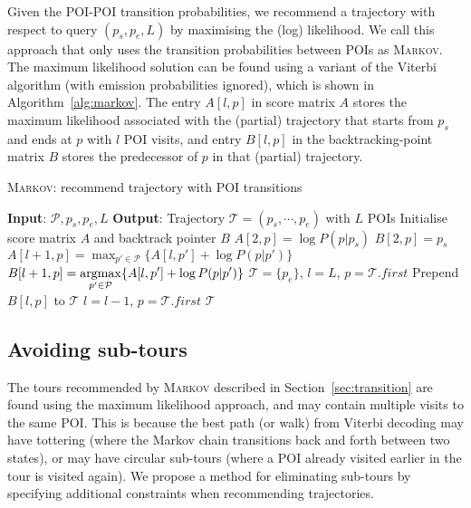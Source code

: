 Given the POI-POI transition probabilities, we recommend a trajectory with respect to query
$(p_s, p_e, L)$ by maximising the (log) likelihood. We call this approach that only uses the
transition probabilities between POIs as \textsc{Markov}. The maximum likelihood solution
can be found using a variant of the Viterbi algorithm (with emission probabilities ignored),
which is shown in Algorithm~\ref{alg:markov}.
The entry $A[l, p]$ in score matrix $A$ stores the maximum likelihood associated with the (partial) trajectory 
that starts from $p_s$ and ends at $p$ with $l$ POI visits, 
and entry $B[l, p]$ in the backtracking-point matrix $B$ stores the predecessor of $p$ in that (partial) trajectory.

\begin{algorithm}[t]
\caption{\textsc{Markov}: recommend trajectory with POI transitions}
\label{alg:markov}
\begin{algorithmic}[1]
\STATE \textbf{Input}: $\mathcal{P}, p_s, p_e, L$
\STATE \textbf{Output}: Trajectory $\mathcal{T} = (p_s, \cdots, p_e)$ with $L$ POIs
\STATE Initialise score matrix $A$ and backtrack pointer $B$
    \STATE $A[2, p] = \log P(p|p_s)$
    \STATE $B[2, p] = p_s$
\ENDFOR
{}
        \STATE \(\displaystyle A[l+1, p] = \max_{p' \in \mathcal{P}} \{ A[l, p'] + \log P(p|p') \} \)
        \STATE \(\displaystyle B[l+1, p] = \operatorname*{argmax}_{p' \in \mathcal{P}} \{ A[l, p'] + \log P(p|p') \} \)
    \ENDFOR
\ENDFOR
\STATE $\mathcal{T} = \{p_e\}$, $l = L$, $p = \mathcal{T}.first$
\REPEAT
    \STATE Prepend $B[l, p]$ to $\mathcal{T}$
    \STATE $l = l - 1$, $p = \mathcal{T}.first$
\RETURN $\mathcal{T}$
\end{algorithmic}
\end{algorithm}


\subsection{Avoiding sub-tours} %
\label{sec:walkpath}

The tours recommended by \textsc{Markov} described in Section~\ref{sec:transition} are found
using the maximum likelihood approach, and may contain multiple visits to the same POI.
This is because the best path (or walk) from Viterbi decoding %
may have tottering (where the Markov chain transitions back and forth between two states),
or may have circular sub-tours (where a POI already visited earlier in the tour is
visited again).
We propose a method for eliminating sub-tours by specifying additional constraints
when recommending trajectories.

